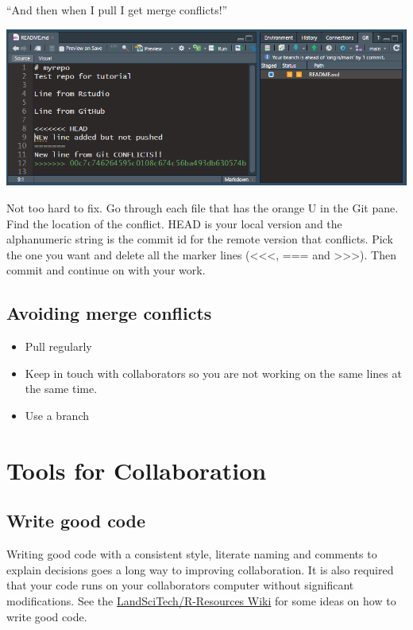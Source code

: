 \documentclass[
  letterpaper,
  DIV=11,
  numbers=noendperiod]{scrreprt}
\providecommand{\tightlist}{%
  \setlength{\itemsep}{0pt}\setlength{\parskip}{0pt}}\usepackage{longtable,booktabs,array}
\begin{document}
``And then when I pull I get merge conflicts!''

\includegraphics{assets/img/merge_conflict.png}

Not too hard to fix. Go through each file that has the orange U in the
Git pane. Find the location of the conflict. HEAD is your local version
and the alphanumeric string is the commit id for the remote version that
conflicts. Pick the one you want and delete all the marker lines
(\textless\textless\textless, === and
\textgreater\textgreater\textgreater). Then commit and continue on with
your work.

\hypertarget{avoiding-merge-conflicts}{%
\subsection{Avoiding merge conflicts}\label{avoiding-merge-conflicts}}

\begin{itemize}
\tightlist
\item
  Pull regularly
\item
  Keep in touch with collaborators so you are not working on the same
  lines at the same time.
\item
  Use a branch
\end{itemize}

\hypertarget{tools-for-collaboration}{%
\section{Tools for Collaboration}\label{tools-for-collaboration}}

\hypertarget{write-good-code}{%
\subsection{Write good code}\label{write-good-code}}

Writing good code with a consistent style, literate naming and comments
to explain decisions goes a long way to improving collaboration. It is
also required that your code runs on your collaborators computer without
significant modifications. See the
\href{https://github.com/LandSciTech/R-Resources/wiki/Minimum-requirements-for-\%22good\%22-code}{LandSciTech/R-Resources
Wiki} for some ideas on how to write good code.
\end{document}
